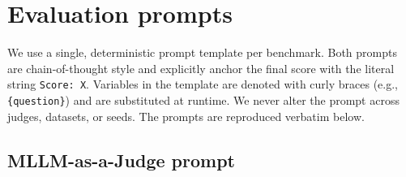 \documentclass{article}
\begin{document}
\section{Evaluation prompts}
\label{app:prompts}

We use a single, deterministic prompt template per benchmark. Both prompts are chain-of-thought style and explicitly anchor the final score with the literal string \texttt{Score: X}. Variables in the template are denoted with curly braces (e.g., \texttt{\{question\}}) and are substituted at runtime. We never alter the prompt across judges, datasets, or seeds. The prompts are reproduced verbatim below.

\subsection{MLLM-as-a-Judge prompt}
\label{app:prompt_mllm}
\end{document}
